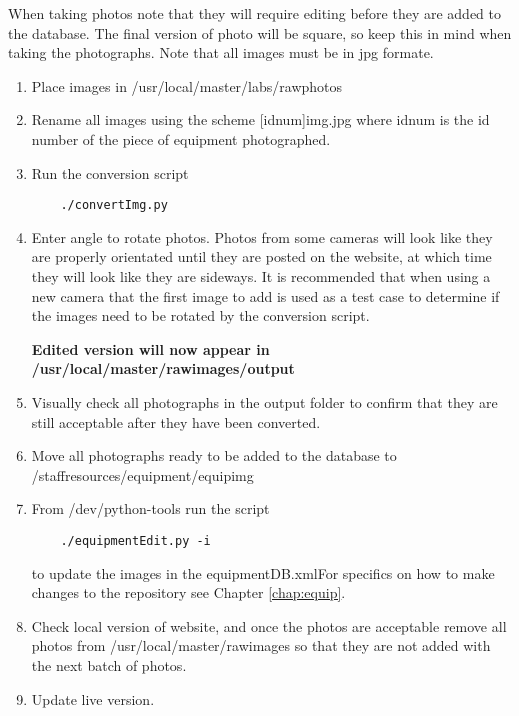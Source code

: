 \documentclass[justified]{pjlProcessDocs}
\begin{document}
When taking photos note that they will require editing before they are added to the database. The final version of photo will be square, so keep this in mind when taking the photographs. Note that all images must be in jpg formate.

\begin{enumerate}
\item Place images in /usr/local/master/labs/rawphotos
\item Rename all images using the scheme [idnum]img.jpg where idnum is the id number of the piece of equipment photographed.
\item Run the conversion script

	\begin{lstlisting}
	./convertImg.py       
	\end{lstlisting}

\item Enter angle to rotate photos. Photos from some cameras will look like they are properly orientated until they are posted on the website, at which time they will look like they are sideways. It is recommended that when using a new camera that the first image to add is used as a test case to determine if the images need to be rotated by the conversion script.

{\bf Edited version will now appear in /usr/local/master/rawimages/output}

\item Visually check all photographs in the output folder to confirm that they are still acceptable after they have been converted.

\item Move all photographs ready to be added to the database to /staffresources/equipment/equipimg
\item From /dev/python-tools run the script

	\begin{lstlisting}
	./equipmentEdit.py -i
	\end{lstlisting}

to update the images in the equipmentDB.xmlFor specifics on how to make changes to the repository see Chapter \ref{chap:equip}.

\item Check local version of website, and once the photos are acceptable remove all photos from /usr/local/master/rawimages so that they are not added with the next batch of photos.

\item Update live version.
\end{enumerate}
\end{document}

